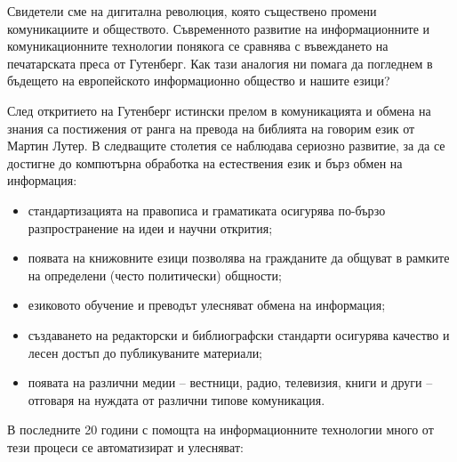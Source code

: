   \clearpage


\begin{multicols}{2}
  Свидетели сме на дигитална революция, която съществено промени комуникациите и обществото. Съвременното развитие на информационните и  комуникационните технологии понякога се сравнява с въвеждането на печатарската преса от Гутенберг. Как тази аналогия ни помага да погледнем в бъдещето на европейското информационно общество и нашите езици?


  След откритието на Гутенберг истински прелом в комуникацията и обмена на знания са постижения от ранга на превода на библията на говорим език от Мартин Лутер. В следващите
   столетия се наблюдава сериозно развитие, за да се достигне до компютърна
  обработка на естествения език и бърз обмен на информация:

  \begin{itemize}
  \item стандартизацията на правописа и граматиката осигурява по-бързо разпространение на идеи и научни открития;
  \item появата на книжовните езици позволява на гражданите да общуват в рамките на определени  (често политически) общности;
  \item езиковото обучение и преводът улесняват обмена на информация;
  \item  създаването на редакторски и библиографски стандарти осигурява качество и лесен достъп до публикуваните материали;
  \item появата на различни медии -- вестници, радио, телевизия, книги и други -- отговаря на нуждата от различни типове комуникация.
  \end{itemize}

  В последните 20 години с помощта на информационните технологии много от тези процеси се автоматизират и улесняват:


\end{multicols}
